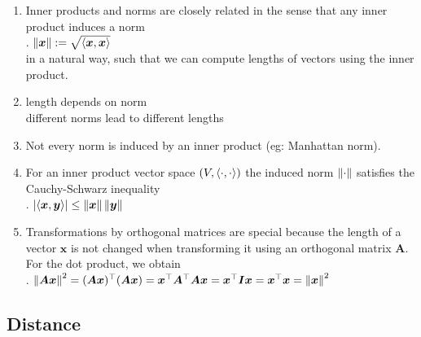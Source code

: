\begin{enumerate}
    \item Inner products and norms are closely related in the sense that any inner product induces a norm
    \hfill \cite{mfml/book/mml/Deisenroth-Faisal-Ong}
    \\
    .\hfill
    $\left\| \bm{x} \right\| := \sqrt{\langle\bm{x}, \bm{x}\rangle}$
    \hfill \cite{mfml/book/mml/Deisenroth-Faisal-Ong}
    \\
    in a natural way, such that we can compute lengths of vectors using the inner product.
    \hfill \cite{mfml/book/mml/Deisenroth-Faisal-Ong}

    \item length depends on norm
    \hfill \cite{common/online/chatgpt}
    \\
    different norms lead to different lengths
    \hfill \cite{common/online/chatgpt}

    \item Not every norm is induced by an inner product (eg: Manhattan norm).
    \hfill \cite{mfml/book/mml/Deisenroth-Faisal-Ong}

    \item 
    \begin{definition}
    For an inner product vector space $(V,\langle\cdot, \cdot\rangle)$ the induced norm $\left\| \cdot \right\|$ satisfies the Cauchy-Schwarz inequality
    \hfill \cite{mfml/book/mml/Deisenroth-Faisal-Ong}
    \\
    .\hfill
    $\left| \langle\bm{x}, \bm{y}\rangle \right| \leq \left\| \bm{x} \right\| \left\| \bm{y} \right\|$
    \hfill \cite{mfml/book/mml/Deisenroth-Faisal-Ong}
    \end{definition}

    \item Transformations by orthogonal matrices are special because the length of a vector $\bm{x}$ is not changed when transforming it using an orthogonal matrix $\bm{A}$. 
    For the dot product, we obtain
    \hfill \cite{mfml/book/mml/Deisenroth-Faisal-Ong}
    \\
    .\hfill
    $
        \left\| \bm{Ax} \right\|^2 
        = (\bm{Ax})^\top (\bm{Ax})
        = \bm{x}^\top \bm{A}^\top \bm{Ax}
        = \bm{x}^\top \bm{Ix}
        = \bm{x}^\top \bm{x}
        = \left\| \bm{x} \right\|^2
    $
    \hfill \cite{mfml/book/mml/Deisenroth-Faisal-Ong}
\end{enumerate}





\subsection{Distance}

